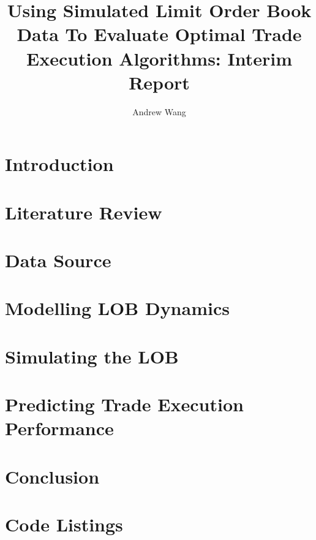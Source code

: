 \documentclass[12pt,lot,lol,lof]{puthesis_undergraduate}
\title{Using Simulated Limit Order Book Data To Evaluate Optimal Trade Execution Algorithms: Interim Report}
\author{Andrew Wang}
\begin{document}
\chapter{Introduction}\label{ch:intro}  %

\chapter{Literature Review}\label{ch:litreview}


\chapter{Data Source}\label{ch:data_source}


\chapter{Modelling LOB Dynamics}\label{ch:experiment}


\chapter{Simulating the LOB} \label{ch:simulation}


\chapter{Predicting Trade Execution Performance} \label{ch:trade_execution}


\chapter{Conclusion}


\chapter{Code Listings}



 \label{bib}
\end{document}
